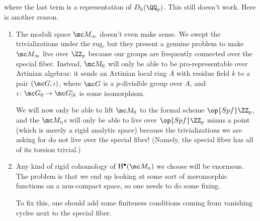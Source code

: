 \documentclass[../notes.tex]{subfiles}
\begin{document}
where the last term is a representation of $D_h(\QQ_p)$. This still doesn't work. Here is another reason.
\begin{enumerate}[label=(\roman*), resume]
	\item The moduli space $\mc M_\infty$ doesn't even make sense. We swept the trivializations under the rug, but they present a genuine problem to make $\mc M_\infty$ live over $\ZZ_p$ because our groups are frequently connected over the special fiber. Instead, $\mc M_0$ will only be able to be pro-representable over Artinian algebras: it sends an Artinian local ring $A$ with residue field $k$ to a pair $(\mc G,\iota)$, where $\mc G$ is a $p$-divisible group over $A$, and $\iota\colon\mc G_0\to\mc G|_k$ is some isomorphism.
	
	We will now only be able to lift $\mc M_0$ to the formal scheme $\op{Spf}\ZZ_p$, and the $\mc M_n$s will only be able to live over $\op{Spf}\ZZ_p$ minus a point (which is merely a rigid analytic space) because the trivializations we are asking for do not live over the special fiber! (Namely, the special fiber has all of its torsion trivial.)

	\item Any kind of rigid cohomology of $\mathrm H^\bullet(\mc M_n)$ we choose will be enormous. The problem is that we end up looking at some sort of meromorphic functions on a non-compact space, so one needs to do some fixing.

	To fix this, one should add some finiteness conditions coming from vanishing cycles next to the special fiber.
\end{enumerate}
\end{document}
